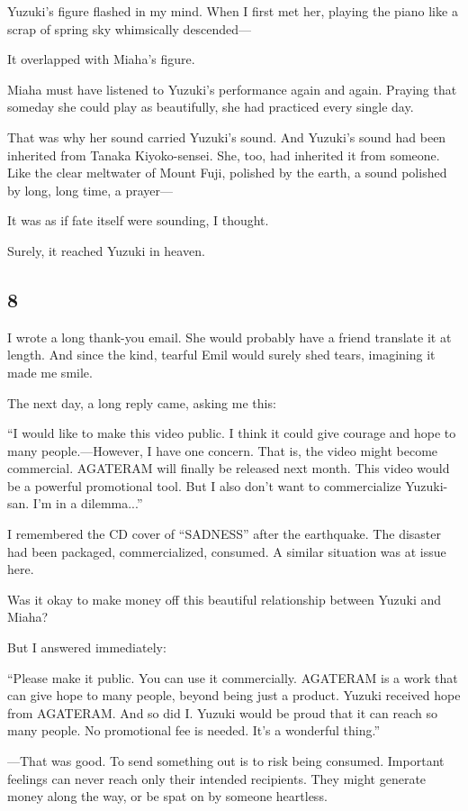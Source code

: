 \documentclass[
    a4paper,
    12pt,
    twoside,
    openany,
    UTF8,
    fontset=windows
]{ctexbook}
\begin{document}
Yuzuki's figure flashed in my mind. When I first met her, playing the piano like a scrap of spring sky whimsically descended---

It overlapped with Miaha's figure.

Miaha must have listened to Yuzuki's performance again and again. Praying that someday she could play as beautifully, she had practiced every single day.

That was why her sound carried Yuzuki's sound. And Yuzuki's sound had been inherited from Tanaka Kiyoko-sensei. She, too, had inherited it from someone. Like the clear meltwater of Mount Fuji, polished by the earth, a sound polished by long, long time, a prayer---

It was as if fate itself were sounding, I thought.

Surely, it reached Yuzuki in heaven.


\subsection*{8}

I wrote a long thank-you email. She would probably have a friend translate it at length. And since the kind, tearful Emil would surely shed tears, imagining it made me smile.

The next day, a long reply came, asking me this:

``I would like to make this video public. I think it could give courage and hope to many people.---However, I have one concern. That is, the video might become commercial. AGATERAM will finally be released next month. This video would be a powerful promotional tool. But I also don't want to commercialize Yuzuki-san. I'm in a dilemma...''

I remembered the CD cover of ``SADNESS'' after the earthquake. The disaster had been packaged, commercialized, consumed. A similar situation was at issue here.

Was it okay to make money off this beautiful relationship between Yuzuki and Miaha?

But I answered immediately:

``Please make it public. You can use it commercially. AGATERAM is a work that can give hope to many people, beyond being just a product. Yuzuki received hope from AGATERAM. And so did I. Yuzuki would be proud that it can reach so many people. No promotional fee is needed. It's a wonderful thing.''

---That was good. To send something out is to risk being consumed. Important feelings can never reach only their intended recipients. They might generate money along the way, or be spat on by someone heartless.
\end{document}
